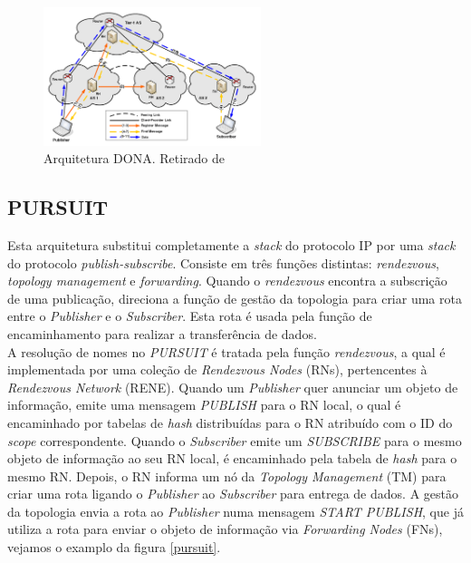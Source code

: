 \documentclass[conference]{IEEEtran}
\begin{document}
\begin{figure}[!t]
\centering
\includegraphics[width=2.5in]{dona}
\caption{Arquitetura DONA. Retirado de \cite{surveyICN}}
\label{dona}
\end{figure}

\subsection{PURSUIT}

Esta arquitetura substitui completamente a \textit{stack} do protocolo IP por uma \textit{stack} do protocolo \textit{publish-subscribe}. Consiste em tr\^{e}s fun\c{c}\~{o}es distintas: \textit{rendezvous}, \textit{topology management} e \textit{forwarding}.
Quando o \textit{rendezvous} encontra a subscri\c{c}\~{a}o de uma publica\c{c}\~{a}o, direciona a fun\c{c}\~{a}o de gest\~{a}o da topologia para criar uma rota entre o \textit{Publisher} e o \textit{Subscriber}. Esta rota \'{e} usada pela fun\c{c}\~{a}o de encaminhamento para realizar a transfer\^{e}ncia de dados.\\

A resolu\c{c}\~{a}o de nomes no \textit{PURSUIT} \'{e} tratada pela fun\c{c}\~{a}o \textit{rendezvous}, a qual \'{e} implementada por uma cole\c{c}\~{a}o de \textit{Rendezvous Nodes} (RNs), pertencentes \`{a} \textit{Rendezvous Network} (RENE). Quando um \textit{Publisher} quer anunciar um objeto de informa\c{c}\~{a}o, emite uma mensagem \textit{PUBLISH} para o RN local, o qual \'{e} encaminhado por tabelas de \textit{hash} distribu\'{i}das para o RN atribu\'{i}do com o ID do \textit{scope} correspondente. Quando o \textit{Subscriber} emite um \textit{SUBSCRIBE} para o mesmo objeto de informa\c{c}\~{a}o ao seu RN local, \'{e} encaminhado pela tabela de \textit{hash} para o mesmo RN. Depois, o RN informa um n\'{o} da \textit{Topology Management} (TM) para criar uma rota ligando o \textit{Publisher} ao \textit{Subscriber} para entrega de dados. A gest\~{a}o da topologia envia a rota ao \textit{Publisher} numa mensagem \textit{START PUBLISH}, que j\'{a} utiliza a rota para enviar o objeto de informa\c{c}\~{a}o via \textit{Forwarding Nodes} (FNs), vejamos o examplo da figura \ref{pursuit}.\\
\end{document}
